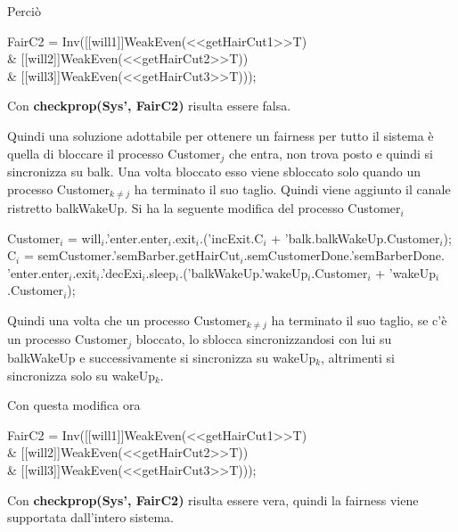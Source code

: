 Perciò

\begin{center}
	\textsf{FairC2 = Inv([[will1]]WeakEven(<<getHairCut1>>T) \\\& [[will2]]WeakEven(<<getHairCut2>>T)) \\\& [[will3]]WeakEven(<<getHairCut3>>T)));}
\end{center}

Con \textbf{checkprop(Sys', FairC2)} risulta essere falsa.

Quindi una soluzione adottabile per ottenere un fairness per tutto il sistema è quella di bloccare il processo \textsf{Customer$_{j}$} che entra, non trova posto e quindi si sincronizza su \textsf{balk}. Una volta bloccato esso viene sbloccato solo quando un processo \textsf{Customer$_{k\not=j}$} ha terminato il suo taglio. Quindi viene aggiunto il canale ristretto \textsf{balkWakeUp}. Si ha la seguente modifica del processo \textsf{Customer$_{i}$}

\textsf{Customer$_{i}$ = will$_{i}$.'enter.enter$_{i}$.exit$_{i}$.('incExit.C$_{i}$ + 'balk.balkWakeUp.Customer$_{i}$);}\\
\textsf{C$_{i}$ = semCustomer.'semBarber.getHairCut$_{i}$.semCustomerDone.'semBarberDone.\\'enter.enter$_{i}$.exit$_{i}$.'decExi$_{i}$.sleep$_{i}$.('balkWakeUp.'wakeUp$_{i}$.Customer$_{i}$ + 'wakeUp$_{i}$.Customer$_{i}$);}

Quindi una volta che un processo \textsf{Customer$_{k\not=j}$} ha terminato il suo taglio, se c'è un processo \textsf{Customer$_{j}$} bloccato, lo sblocca sincronizzandosi con lui su \textsf{balkWakeUp} e successivamente si sincronizza su \textsf{wakeUp$_{k}$}, altrimenti si sincronizza solo su \textsf{wakeUp$_{k}$}.

Con questa modifica ora 

\begin{center}
	\textsf{FairC2 = Inv([[will1]]WeakEven(<<getHairCut1>>T) \\\& [[will2]]WeakEven(<<getHairCut2>>T)) \\\& [[will3]]WeakEven(<<getHairCut3>>T)));}
\end{center}

Con \textbf{checkprop(Sys', FairC2)} risulta essere vera, quindi la fairness viene supportata dall'intero sistema.